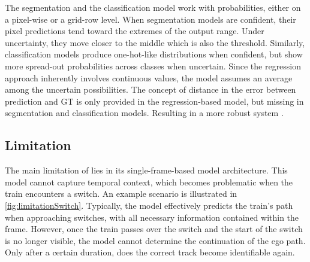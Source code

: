 The segmentation and the classification model work with probabilities, either on a pixel-wise or a grid-row level.
When segmentation models are confident, their pixel predictions tend toward the extremes of the output range.
Under uncertainty, they move closer to the middle which is also the threshold.
Similarly, classification models produce one-hot-like distributions when confident, but show more spread-out probabilities across classes when uncertain.
Since the regression approach inherently involves continuous values, the model assumes an average among the uncertain possibilities.
The concept of distance in the error between prediction and \ac{GT} is only provided in the regression-based model, but missing in segmentation and classification models.
Resulting in a more robust system \cite{tepNet2024}.

\subsection{Limitation}

The main limitation of \cite{tepNet2024} lies in its single-frame-based model architecture.
This model cannot capture temporal context, which becomes problematic when the train encounters a switch.
An example scenario is illustrated in \autoref{fig:limitationSwitch}.
Typically, the model effectively predicts the train's path when approaching switches, with all necessary information contained within the frame.
However, once the train passes over the switch and the start of the switch is no longer visible, the model cannot determine the continuation of the ego path.
Only after a certain duration, does the correct track become identifiable again.


